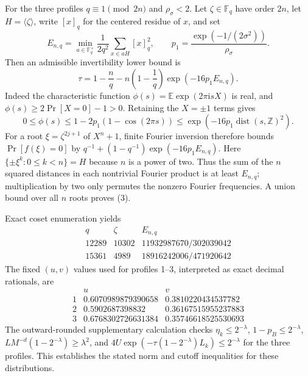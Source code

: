 \documentclass[lettersize,journal]{IEEEtran}
\begin{document}
For the three profiles $q\equiv1\pmod{2n}$ and $\rho_\sigma<2$.
Let $\zeta\in\mathbb F_q$ have order $2n$, let
$H=\langle\zeta\rangle$, write $[x]_q$ for the centered residue of
$x$, and set
\[
E_{n,q}=\min_{a\in\mathbb F_q^\times}
\frac1{2q^2}\sum_{x\in aH}[x]_q^2,
\qquad p_1=\frac{\exp(-1/(2\sigma^2))}{\rho_\sigma}.
\]
Then an admissible invertibility lower bound is
\begin{equation}\label{eq:tight-invertibility}
	\tau=1-\frac nq-n\left(1-\frac1q\right)
	\exp(-16p_1E_{n,q}).
\end{equation}
Indeed the characteristic function
$\phi(s)=\mathbb E\exp(2\pi\mathrm i sX)$ is real, and
$\phi(s)\ge2\Pr[X=0]-1>0$. Retaining the $X=\pm1$ terms gives
\[
0\le\phi(s)\le1-2p_1(1-\cos(2\pi s))
\le\exp(-16p_1\operatorname{dist}(s,\mathbb Z)^2).
\]
For a root $\xi=\zeta^{2j+1}$ of $X^n+1$, finite Fourier inversion
therefore bounds $\Pr[f(\xi)=0]$ by
$q^{-1}+(1-q^{-1})\exp(-16p_1E_{n,q})$.
Here $\{\pm\xi^k:0\le k<n\}=H$ because $n$ is a power of two.
Thus the sum of the $n$ squared distances in each nontrivial Fourier
product is at least $E_{n,q}$; multiplication by two only permutes the
nonzero Fourier frequencies. A union bound over all $n$ roots proves (3).

Exact coset enumeration yields
\[
\begin{array}{c|c|c}
	q&\zeta&E_{n,q}\\ \hline
	12289&10302&11932987670/302039042\\
	15361&4989&18916242006/471920642
\end{array}
\]
The fixed $(u,v)$ values used for profiles 1--3, interpreted as exact
decimal rationals, are
\[
\begin{array}{c|cc}
	&u&v\\ \hline
	1&0.6070989879390658&0.3810220434537782\\
	2&0.5902687398832&0.36167515955237883\\
	3&0.6768302726631384&0.35746618525530693
\end{array}
\]
The outward-rounded supplementary calculation checks
$\eta_k\le2^{-\lambda}$, $1-p_B\le2^{-\lambda}$,
$LM^{-d}(1-2^{-\lambda})\ge\lambda^2$, and
$4U\exp(-\tau(1-2^{-\lambda})L_k)\le2^{-\lambda}$
for the three profiles. This establishes the stated norm and cutoff
inequalities for these distributions. 
	
\end{document}
